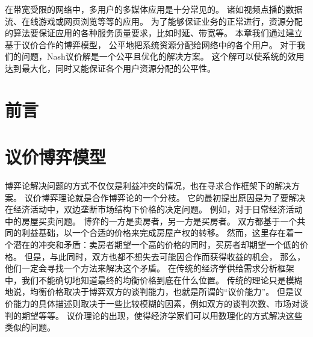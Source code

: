 \graphicspath{ {../body/nash_bargaining_figures/} }
在带宽受限的网络中，多用户的多媒体应用是十分常见的。
诸如视频点播的数据流、在线游戏或网页浏览等等的应用。
为了能够保证业务的正常进行，资源分配的算法要保证应用的各种服务质量要求，比如时延、带宽等。
本章我们通过建立基于议价合作的博弈模型，
公平地把系统资源分配给网络中的各个用户。
对于我们的问题，Nash议价解是一个公平且优化的解决方案。
这个解可以使系统的效用达到最大化，同时又能保证各个用户资源分配的公平性。

\section{前言}

\section{议价博弈模型}
博弈论解决问题的方式不仅仅是利益冲突的情况，也在寻求合作框架下的解决方案。
议价博弈理论就是合作博弈论的一个分枝。
它的最初提出原因是为了要解决在经济活动中，双边垄断市场结构下价格的决定问题。
例如，对于日常经济活动中的房屋买卖问题。
博弈的一方是卖房者，另一方是买房者。
双方都基于一个共同的利益基础，以一个合适的价格来完成房屋产权的转移。
然而，这里存在着一个潜在的冲突和矛盾：卖房者期望一个高的价格的同时，买房者却期望一个低的价格。
但是，与此同时，双方也都不想失去可能因合作而获得收益的机会，
那么，他们一定会寻找一个方法来解决这个矛盾。
在传统的经济学供给需求分析框架中，我们不能确切地知道最终的均衡价格到底在什么位置。
传统的理论只是模糊地说，均衡价格取决于博弈双方的谈判能力，也就是所谓的“议价能力”。
但是议价能力的具体描述则取决于一些比较模糊的因素，例如双方的谈判次数、市场对谈判的期望等等。
议价理论的出现，使得经济学家们可以用数理化的方式解决这些类似的问题。

